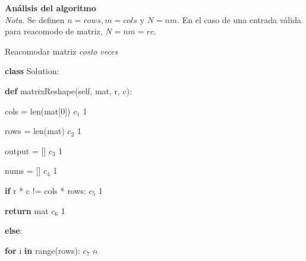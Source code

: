 \documentclass{article}
\begin{document}
\textbf{Análisis del algoritmo} \\
\textit{Nota.} Se definen $n=rows, m = cols$ y $N = nm$. En el caso de una entrada válida para reacomodo de matriz,  $N=nm=rc$.
\begin{algorithm}
\caption{Reacomodar matriz \hspace{3.5cm} \textit{costo} \hspace{0.5cm} \textit{veces}}\label{Primer algoritmo}
\begin{algorithmic}
\item \textbf{class} Solution:
    \item \hspace{0.3cm} \textbf{def} matrixReshape(self, mat, r, c):
    \item \hspace{0.7cm} cols = len(mat[0]) \hspace{5.2cm} $c_1$ \hspace{1.1cm} 1
        \item \hspace{0.7cm} rows = len(mat) \hspace{5.45cm} $c_2$ \hspace{1.1cm} 1
        \item \hspace{0.7cm} output = [] \hspace{6.25cm} $c_3$ \hspace{1.1cm} 1
        \item \hspace{0.7cm} nums = [] \hspace{6.5cm} $c_4$ \hspace{1.1cm} 1
        \item \hspace{0.7cm} \textbf{if} r * c != cols * rows: \hspace{4.5cm} $c_5$ \hspace{1.1cm} 1
            \item \hspace{1.2cm} \textbf{return} mat \hspace{5.6cm} $c_6$ \hspace{1.1cm} 1
        \item \hspace{0.7cm} \textbf{else}: 
            \item \hspace{1.2cm} \textbf{for} i \textbf{in} range(rows): \hspace{4.3cm} $c_7$ \hspace{1.1cm} $n$

\end{algorithmic}
\end{algorithm}
\end{document}
